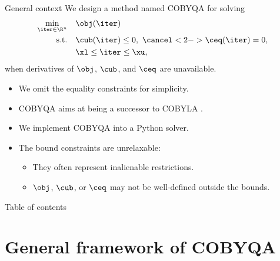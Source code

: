 \documentclass[optimization]{common/talk}
\begin{document}
\begin{frame}{General context}
    We design a method named \alert{COBYQA} for solving
    \begin{equation*}
        \begin{aligned}
            \min_{\iter \in \R^n}   & \quad \obj ( \iter ) \\
            \textrm{s.t.}           & \quad \cub ( \iter ) \le 0, ~ \cancel<2->{\ceq ( \iter ) = 0},\\
                                    & \quad \xl \le \iter \le \xu,
        \end{aligned}
    \end{equation*}
    when derivatives of $\obj$, $\cub$, and $\ceq$ are \alert{unavailable}.

    \pause
    \medskip

    \begin{block}{}
        \begin{itemize}
            \item We omit the equality constraints for simplicity.
            \item COBYQA aims at being a \alert{successor} to COBYLA \cite{Powell_1994}.
            \item We \alert{implement} COBYQA into a Python solver.
            \item The bound constraints are \alert{unrelaxable}:
            \begin{itemize}
                \item They often represent \alert{inalienable} restrictions.
                \item $\obj$, $\cub$, or $\ceq$ may not be well-defined outside the bounds.
            \end{itemize}
        \end{itemize}
    \end{block}
\end{frame}

\begin{frame}{Table of contents}
    \tableofcontents[hideallsubsections]
\end{frame}

\section{General framework of COBYQA}
\end{document}
